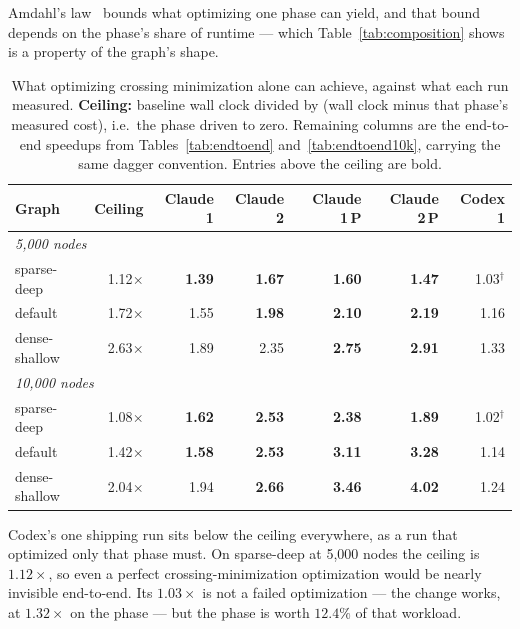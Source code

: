 Amdahl's law~\cite{amdahl1967validity} bounds what optimizing one phase can
yield, and that bound depends on the phase's share of runtime --- which
Table~\ref{tab:composition} shows is a property of the graph's shape.

\begin{table}[htbp]
\centering
\caption{What optimizing crossing minimization alone can achieve, against what
each run measured. \textbf{Ceiling:} baseline wall clock divided by (wall clock
minus that phase's measured cost), i.e.\ the phase driven to zero. Remaining
columns are the end-to-end speedups from Tables~\ref{tab:endtoend}
and~\ref{tab:endtoend10k}, carrying the same dagger convention. Entries above
the ceiling are bold.}
\label{tab:ceiling}
\small
\begin{tabular}{lrrrrrr}
\toprule
\textbf{Graph} & \textbf{Ceiling} & \textbf{Claude 1} & \textbf{Claude 2} & \textbf{Claude 1\,P} & \textbf{Claude 2\,P} & \textbf{Codex 1} \\
\midrule
\multicolumn{7}{l}{\emph{5{,}000 nodes}} \\
sparse-deep   & 1.12$\times$ & \textbf{1.39} & \textbf{1.67} & \textbf{1.60} & \textbf{1.47} & 1.03$^\dagger$ \\
default       & 1.72$\times$ & 1.55 & \textbf{1.98} & \textbf{2.10} & \textbf{2.19} & 1.16 \\
dense-shallow & 2.63$\times$ & 1.89 & 2.35 & \textbf{2.75} & \textbf{2.91} & 1.33 \\
\midrule
\multicolumn{7}{l}{\emph{10{,}000 nodes}} \\
sparse-deep   & 1.08$\times$ & \textbf{1.62} & \textbf{2.53} & \textbf{2.38} & \textbf{1.89} & 1.02$^\dagger$ \\
default       & 1.42$\times$ & \textbf{1.58} & \textbf{2.53} & \textbf{3.11} & \textbf{3.28} & 1.14 \\
dense-shallow & 2.04$\times$ & 1.94 & \textbf{2.66} & \textbf{3.46} & \textbf{4.02} & 1.24 \\
\bottomrule
\end{tabular}
\end{table}

Codex's one shipping run sits below the ceiling everywhere, as a run that
optimized only that phase must. On sparse-deep at 5{,}000 nodes the ceiling is
$1.12\times$, so even a perfect crossing-minimization optimization would be
nearly invisible end-to-end. Its $1.03\times$ is not a failed optimization ---
the change works, at $1.32\times$ on the phase --- but the phase is worth
$12.4\%$ of that workload.

